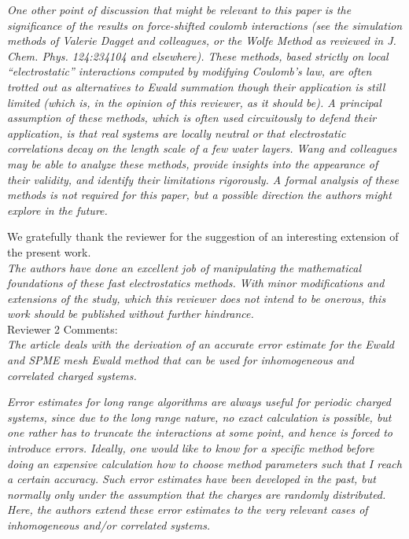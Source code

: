 \documentclass[a4paper]{article}
\begin{document}
\textit{
One other point of discussion that might be relevant to this paper is
the significance of the results on force-shifted coulomb interactions
(see the simulation methods of Valerie Dagget and colleagues, or the
Wolfe Method as reviewed in J. Chem. Phys. 124:234104 and elsewhere).
These methods, based strictly on local “electrostatic” interactions
computed by modifying Coulomb’s law, are often trotted out as
alternatives to Ewald summation though their application is still
limited (which is, in the opinion of this reviewer, as it should be).
A principal assumption of these methods, which is often used
circuitously to defend their application, is that real systems are
locally neutral or that electrostatic correlations decay on the length
scale of a few water layers.  Wang and colleagues may be able to
analyze these methods, provide insights into the appearance of their
validity, and identify their limitations rigorously.  A formal
analysis of these methods is not required for this paper, but a
possible direction the authors might explore in the future.
}

We gratefully thank the reviewer for the suggestion of an interesting
extension of the present work.\\

\textit{
The authors have done an excellent job of manipulating the
mathematical foundations of these fast electrostatics methods.  With
minor modifications and extensions of the study, which this reviewer
does not intend to be onerous, this work should be published without
further hindrance.
}\\



\noindent
Reviewer  2 Comments:\\

\textit{ The article deals with the derivation of an accurate error
  estimate for the Ewald and SPME mesh Ewald method that can be used
  for inhomogeneous and correlated charged systems.
}

\textit{
Error estimates for long range algorithms are always useful for
periodic charged systems, since due to the long range nature, no exact
calculation is possible, but one rather has to truncate the
interactions at some point, and hence is forced to introduce errors.
Ideally, one would like to know for a specific method before doing an
expensive calculation how to choose method parameters such that I
reach a certain accuracy. Such error estimates have been developed in
the past, but normally only under the assumption that the charges are
randomly distributed. Here, the authors extend these error estimates
to the very relevant cases of inhomogeneous and/or correlated systems.
}
\end{document}
